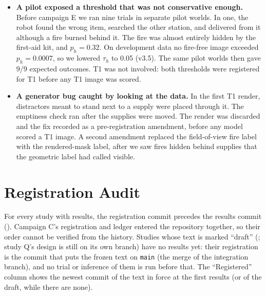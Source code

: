 \documentclass[conference]{IEEEtran}
\newcommand{\tauh}{\tau_{h}}
\begin{document}
\begin{itemize}
With a 0.6\,s stall injected before departure, the old guard failed 2/2 runs and the new one completed 2/2.
Raising priority with a file capability then had a side effect: it put the exec into the dynamic loader's secure mode,
which stripped \texttt{LD\_LIBRARY\_PATH} and broke the ROS bag recorder. A regression run caught this before any campaign.
\item \textbf{A pilot exposed a threshold that was not conservative enough.} Before campaign E we ran nine trials in
separate pilot worlds. In one, the robot found the wrong item, searched the other station, and delivered from it although a fire
burned behind it. The fire was almost entirely hidden by the first-aid kit, and $p_h=0.32$. On development data no fire-free
image exceeded $p_h=0.0007$, so we lowered $\tauh$ to 0.05 (v3.5). The same pilot worlds then gave 9/9 expected outcomes.
T1 was not involved: both thresholds were registered for T1 before any T1 image was scored.
\item \textbf{A generator bug caught by looking at the data.} In the first T1 render, distractors meant to stand next to a supply were placed through it. The
emptiness check ran after the supplies were moved. The render was discarded and the fix recorded as a
pre-registration amendment, before any model scored a T1 image. A second amendment replaced the field-of-view fire
label with the rendered-mask label, after we saw fires hidden behind supplies that the geometric label had called visible.
\end{itemize}

\section{Registration Audit}\label{app:prereg}
\begin{table}[h]\centering\caption{When each study was registered and when its first results entered the repository. ``Order''
checks that the registration commit is an ancestor of the first results commit (\texttt{git merge-base --is-ancestor}).
Registrations are also mirrored in the public repository history. Studies without results yet show the draft commit or .}\label{tab:prereg}
\resizebox{\linewidth}{!}{}\end{table}
For every study with results, the registration commit precedes the results commit (\PreregOrderOK). Campaign C's
registration and ledger entered the repository together, so their order cannot be verified from the history.
Studies whose text is marked ``draft'' (\PreregDrafts{}; study Q's design is still on its own branch) have no results yet: their registration is the commit that puts the frozen text on \texttt{main} (the merge of the integration branch), and no trial or inference of them is run before that. The ``Registered'' column shows the newest commit of the text in force at the first results (or of the draft, while there are none).
\end{document}
